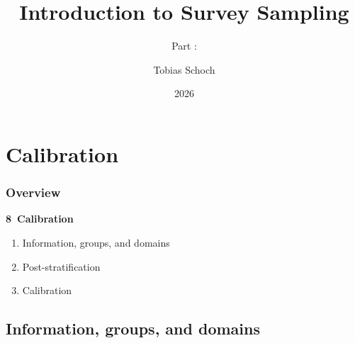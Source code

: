 \documentclass{my_eth_beamer}
\title{Introduction to Survey Sampling}
\subtitle{Part \NR: \TITLE}
\author[Tobias Schoch]{Tobias Schoch}
\date{2026}
\numberwithin{equation}{section}
\newcommand{\TITLE}{Calibration}
\newcommand{\NR}{8}
\begin{document}

\section{\TITLE}\label{sec:calib}
\setcounter{section}{\NR}
\setcounter{Bsp}{19}
\setcounter{Def}{13}
\setcounter{EinSatz}{1}

\begin{frame}
    \frametitle{Overview}
    \noindent \hspace{0.2em}\textcolor{fhnwblue}{\bfseries \NR~\TITLE}
    \vspace{0.25em}
    \begin{enumerate}[\NR.1]
    \setlength{\itemsep}{4pt}
        \item Information, groups, and domains
        \item Post-stratification
        \item Calibration
    \end{enumerate}
\end{frame}

\subsection{Information, groups, and domains}
\end{document}
